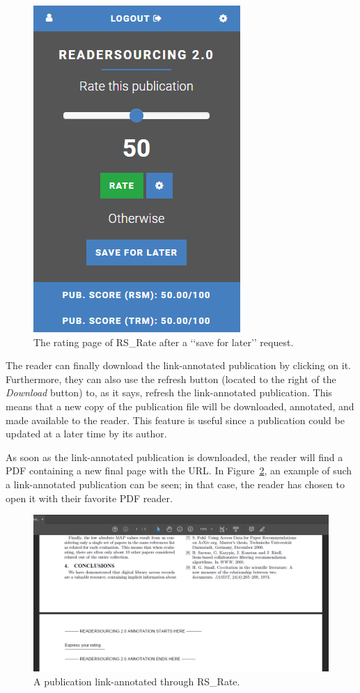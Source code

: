 \documentclass[a4paper, english]{article}
\newcommand{\rsrate}{RS\_Rate\xspace}
\begin{document}
\begin{figure}
\centering
\includegraphics[scale=0.7]{figures/rating.PNG}
\caption{The rating page of \rsrate after a \lq\lq save for later\rq\rq{} request.}
\label{fig:rating-2}
\end{figure}

The reader can finally download the link-annotated publication by clicking on it. Furthermore, they can also use the refresh button (located to the right of the \emph{Download} button) to, as it says, refresh the link-annotated publication. This means that a new copy of the publication file will be downloaded, annotated, and made available to the reader. This feature is useful since a publication could be updated at a later time by its author.

As soon as the link-annotated publication is downloaded, the reader will find a PDF containing a new final page with the URL. In Figure~\ref{fig:reference}, an example of such a link-annotated publication can be seen; in that case, the reader has chosen to open it with their favorite PDF reader.

\begin{figure}
\centering
\includegraphics[width=\textwidth]{figures/reference.png}
\caption{A publication link-annotated through \rsrate.}
\label{fig:reference}
\end{figure}
\end{document}
